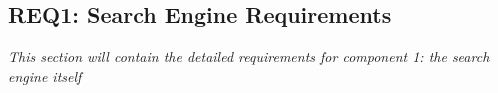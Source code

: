 \subsection{REQ1: Search Engine Requirements}

\textit{This section will contain the detailed requirements for component 1: the search engine itself}

